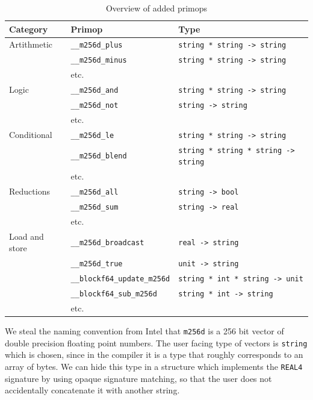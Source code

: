 \documentclass{article}
\begin{document}
\begin{table}
\begin{tabular}{ l l l }
    \toprule
    Category & Primop & Type \\
    \midrule
    Artithmetic & \verb!__m256d_plus! & \verb!string * string -> string! \\
                & \verb!__m256d_minus! & \verb!string * string -> string! \\
                & etc. & \\
                \midrule 
    Logic       & \verb!__m256d_and! & \verb!string * string -> string! \\
                & \verb!__m256d_not! & \verb!string -> string! \\
                & etc. & \\
                \midrule 
    Conditional & \verb!__m256d_le! & \verb!string * string -> string! \\
                & \verb!__m256d_blend! & \verb!string * string * string -> string! \\
                & etc. & \\
                \midrule 
    Reductions  & \verb!__m256d_all! & \verb!string -> bool! \\
                & \verb!__m256d_sum! & \verb!string -> real! \\
                & etc. & \\
                \midrule 
    Load and store & \verb!__m256d_broadcast! & \verb!real -> string! \\
                   & \verb!__m256d_true! & \verb!unit -> string! \\
                   & \verb!__blockf64_update_m256d! & \verb!string * int * string -> unit! \\
                   & \verb!__blockf64_sub_m256d! & \verb!string * int -> string! \\
                   & etc. & \\
                   \bottomrule
\end{tabular}
\caption{Overview of added primops}
\label{tbl:primops}
\end{table}

We steal the naming convention from Intel that \texttt{m256d} is a 256 bit vector of double precision floating point numbers. The user facing type of vectors is \verb!string! which is chosen, since in the compiler it is a type that roughly corresponds to an array of bytes. We can hide this type in a structure which implements the \texttt{REAL4} signature by using opaque signature matching, so that the user does not accidentally concatenate it with another string.
\end{document}
